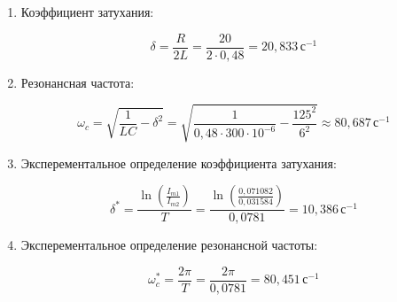 \begin{enumerate}
	\item Коэффициент затухания:

	      \[
		      \delta = \frac{R}{2L} = \frac{20}{2 \cdot 0,48} = 20,833 \, \text{с}^{-1}
	      \]

	\item Резонансная частота:

	      \[
		      \omega_c = \sqrt{\frac{1}{LC} - \delta^2} = \sqrt{\frac{1}{0,48 \cdot 300 \cdot 10^{-6}} - \frac{125^2}{6^2}} \approx 80,687 \, \text{с}^{-1}
	      \]

	\item Эксперементальное определение коэффициента затухания:

	      \[
		      \delta^* = \frac{\ln{\left(\frac{I_{m1}}{I_{m2}}\right)}}{T} = \frac{\ln{\left(\frac{0,071082}{0,031584}\right)}}{0,0781} = 10,386 \, \text{с}^{-1}
	      \]

	\item Эксперементальное определение резонансной частоты:

	    \[
	        \omega_c^* = \frac{2\pi}{T} = \frac{2\pi}{0,0781} = 80,451 \, \text{с}^{-1}
	    \]
\end{enumerate}
